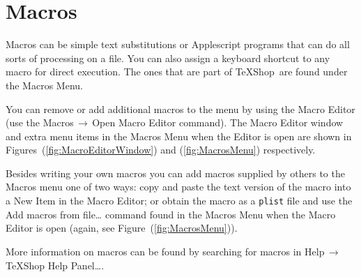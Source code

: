 \documentclass[letterpaper,11pt]{article}
\newcommand{\TS}{\textsf{\TeX Shop}}
\newcommand{\cmd}[1]{\textsf{#1}}
\newcommand{\mnu}[1]{\textsf{#1}}
\newcommand{\To}{\,\(\to\)\,}
\begin{document}
\section{Macros}

Macros can be simple text substitutions or Applescript programs that can do all sorts of processing on a file. You can also assign a keyboard shortcut to any macro for direct execution. The ones that are part of \TS\ are found under the \mnu{Macros} Menu.

You can remove or add additional macros to the menu by using the \mnu{Macro Editor} (use the \mnu{Macros}\To\mnu{Open Macro Editor} command). The \mnu{Macro Editor} window and extra menu items in the \mnu{Macros} Menu when the Editor is open are shown in Figures~(\ref{fig:MacroEditorWindow}) and (\ref{fig:MacrosMenu}) respectively.

Besides writing your own macros you can add macros supplied by others to the \mnu{Macros} menu one of two ways: copy and paste the text version of the macro into a \mnu{New Item} in the \mnu{Macro Editor}; or obtain the macro as a \texttt{plist} file and use the \mnu{Add macros from file…} command found in the \mnu{Macros} Menu when the \mnu{Macro Editor} is open (again, see Figure~(\ref{fig:MacrosMenu})).

More information on macros can be found by searching for \cmd{macros} in \mnu{Help}\To\mnu{TeXShop Help Panel…}.

\begin{figure}
\begin{floatrow}
%
\end{floatrow}
\end{figure}
\end{document}
